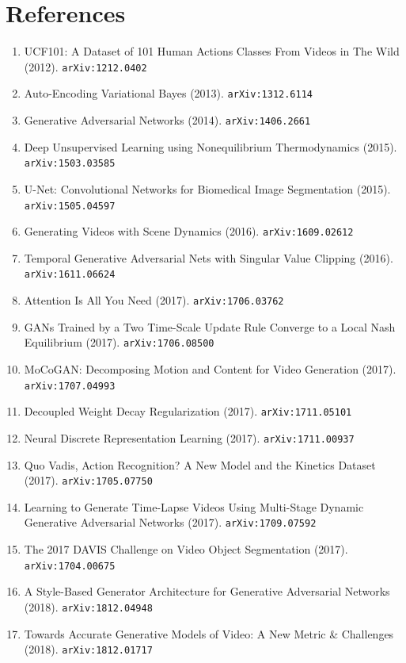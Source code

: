 \documentclass[11pt]{article}
\begin{document}
\section*{References}
\begin{enumerate}\small
  \item UCF101: A Dataset of 101 Human Actions Classes From Videos in The Wild (2012). \texttt{arXiv:1212.0402}
  \item Auto-Encoding Variational Bayes (2013). \texttt{arXiv:1312.6114}
  \item Generative Adversarial Networks (2014). \texttt{arXiv:1406.2661}
  \item Deep Unsupervised Learning using Nonequilibrium Thermodynamics (2015). \texttt{arXiv:1503.03585}
  \item U-Net: Convolutional Networks for Biomedical Image Segmentation (2015). \texttt{arXiv:1505.04597}
  \item Generating Videos with Scene Dynamics (2016). \texttt{arXiv:1609.02612}
  \item Temporal Generative Adversarial Nets with Singular Value Clipping (2016). \texttt{arXiv:1611.06624}
  \item Attention Is All You Need (2017). \texttt{arXiv:1706.03762}
  \item GANs Trained by a Two Time-Scale Update Rule Converge to a Local Nash
  Equilibrium (2017). \texttt{arXiv:1706.08500}
  \item MoCoGAN: Decomposing Motion and Content for Video Generation (2017). \texttt{arXiv:1707.04993}
  \item Decoupled Weight Decay Regularization (2017). \texttt{arXiv:1711.05101}
  \item Neural Discrete Representation Learning (2017). \texttt{arXiv:1711.00937}
  \item Quo Vadis, Action Recognition? A New Model and the Kinetics Dataset (2017). \texttt{arXiv:1705.07750}
  \item Learning to Generate Time-Lapse Videos Using Multi-Stage Dynamic
  Generative Adversarial Networks (2017). \texttt{arXiv:1709.07592}
  \item The 2017 DAVIS Challenge on Video Object Segmentation (2017). \texttt{arXiv:1704.00675}
  \item A Style-Based Generator Architecture for Generative Adversarial Networks (2018). \texttt{arXiv:1812.04948}
  \item Towards Accurate Generative Models of Video: A New Metric \& Challenges (2018). \texttt{arXiv:1812.01717}

\end{enumerate}
\end{document}
